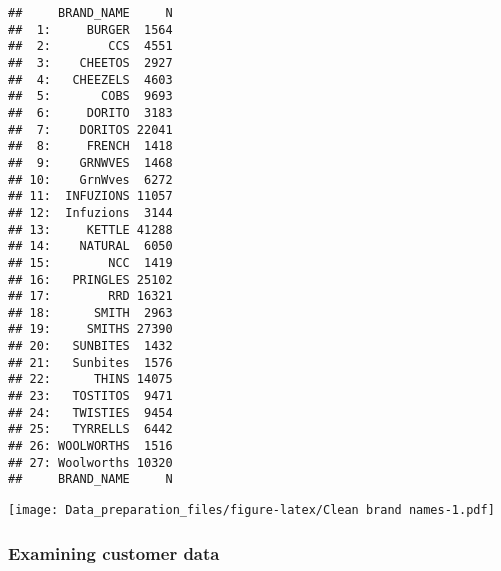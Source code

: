 \documentclass[
]{article}
\newenvironment{Shaded}{\begin{snugshade}}{\end{snugshade}}
\newcommand{\AttributeTok}[1]{\textcolor[rgb]{0.77,0.63,0.00}{#1}}
\newcommand{\ConstantTok}[1]{\textcolor[rgb]{0.00,0.00,0.00}{#1}}
\newcommand{\DecValTok}[1]{\textcolor[rgb]{0.00,0.00,0.81}{#1}}
\newcommand{\DocumentationTok}[1]{\textcolor[rgb]{0.56,0.35,0.01}{\textbf{\textit{#1}}}}
\newcommand{\FloatTok}[1]{\textcolor[rgb]{0.00,0.00,0.81}{#1}}
\newcommand{\FunctionTok}[1]{\textcolor[rgb]{0.00,0.00,0.00}{#1}}
\newcommand{\NormalTok}[1]{#1}
\newcommand{\OtherTok}[1]{\textcolor[rgb]{0.56,0.35,0.01}{#1}}
\newcommand{\SpecialCharTok}[1]{\textcolor[rgb]{0.00,0.00,0.00}{#1}}
\newcommand{\StringTok}[1]{\textcolor[rgb]{0.31,0.60,0.02}{#1}}
\begin{document}
\begin{verbatim}
##     BRAND_NAME     N
##  1:     BURGER  1564
##  2:        CCS  4551
##  3:    CHEETOS  2927
##  4:   CHEEZELS  4603
##  5:       COBS  9693
##  6:     DORITO  3183
##  7:    DORITOS 22041
##  8:     FRENCH  1418
##  9:    GRNWVES  1468
## 10:    GrnWves  6272
## 11:  INFUZIONS 11057
## 12:  Infuzions  3144
## 13:     KETTLE 41288
## 14:    NATURAL  6050
## 15:        NCC  1419
## 16:   PRINGLES 25102
## 17:        RRD 16321
## 18:      SMITH  2963
## 19:     SMITHS 27390
## 20:   SUNBITES  1432
## 21:   Sunbites  1576
## 22:      THINS 14075
## 23:   TOSTITOS  9471
## 24:   TWISTIES  9454
## 25:   TYRRELLS  6442
## 26: WOOLWORTHS  1516
## 27: Woolworths 10320
##     BRAND_NAME     N
\end{verbatim}

\begin{Shaded}
\end{Shaded}

\texttt{[image: Data\_preparation\_files/figure-latex/Clean brand names-1.pdf]}

\hypertarget{examining-customer-data}{%
\subsubsection{Examining customer data}\label{examining-customer-data}}
\end{document}
